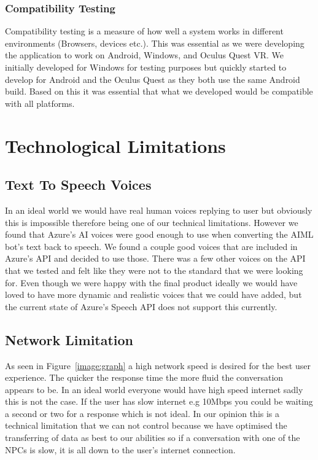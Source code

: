 \subsubsection{Compatibility Testing}
Compatibility testing is a measure of how well a system works in different environments (Browsers, devices etc.). This was essential as we were developing the application to work on Android, Windows, and Oculus Quest VR. We initially developed for Windows for testing purposes but quickly started to develop for Android and the Oculus Quest as they both use the same Android build. Based on this it was essential that what we developed would be compatible with all platforms.

\section{Technological Limitations}

\subsection{Text To Speech Voices}
In an ideal world we would have real human voices replying to user but obviously this is impossible therefore being one of our technical limitations. However we found that Azure's AI voices were good enough to use when converting the AIML bot's text back to speech. We found a couple good voices that are included in Azure's API and decided to use those. There was a few other voices on the API that we tested and felt like they were not to the standard that we were looking for. Even though we were happy with the final product ideally we would have loved to have more dynamic and realistic voices that we could have added, but the current state of Azure's Speech API does not support this currently.

\subsection{Network Limitation}
As seen in Figure~\ref{image:graph} a high network speed is desired for the best user experience. The quicker the response time the more fluid the conversation appears to be. In an ideal world everyone would have high speed internet sadly this is not the case. If the user has slow internet e.g 10Mbps you could be waiting a second or two for a response which is not ideal. In our opinion this is a technical limitation that we can not control because we have optimised the transferring of data as best to our abilities so if a conversation with one of the NPCs is slow, it is all down to the user's internet connection. 

